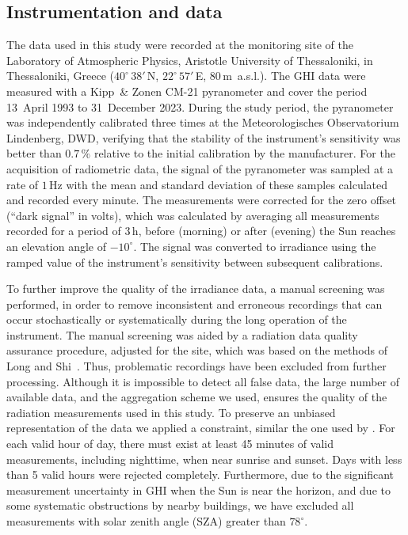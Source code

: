 \documentclass[preprint, 5p,
authoryear]{elsarticle} %
\begin{document}
\hypertarget{instrumentation-and-data}{%
\subsection{Instrumentation and data}\label{instrumentation-and-data}}

The data used in this study were recorded at the monitoring site of the
Laboratory of Atmospheric Physics, Aristotle University of Thessaloniki,
in Thessaloniki, Greece (\(40^\circ\,38'\,\)N, \(22^\circ\,57'\,\)E,
\(80\,\)m~a.s.l.). The GHI data were measured with a Kipp~\& Zonen CM-21
pyranometer and cover the period 13~April 1993 to 31~December 2023.
During the study period, the pyranometer was independently calibrated
three times at the Meteorologisches Observatorium Lindenberg, DWD,
verifying that the stability of the instrument's sensitivity was better
than \(0.7\,\%\) relative to the initial calibration by the
manufacturer. For the acquisition of radiometric data, the signal of the
pyranometer was sampled at a rate of \(1\,\text{Hz}\) with the mean and
standard deviation of these samples calculated and recorded every
minute. The measurements were corrected for the zero offset (``dark
signal'' in volts), which was calculated by averaging all measurements
recorded for a period of \(3\,\text{h}\), before (morning) or after
(evening) the Sun reaches an elevation angle of \(-10^\circ\). The
signal was converted to irradiance using the ramped value of the
instrument's sensitivity between subsequent calibrations.

To further improve the quality of the irradiance data, a manual
screening was performed, in order to remove inconsistent and erroneous
recordings that can occur stochastically or systematically during the
long operation of the instrument. The manual screening was aided by a
radiation data quality assurance procedure, adjusted for the site, which
was based on the methods of Long and Shi~\citep{Long2006, Long2008a}.
Thus, problematic recordings have been excluded from further processing.
Although it is impossible to detect all false data, the large number of
available data, and the aggregation scheme we used, ensures the quality
of the radiation measurements used in this study. To preserve an
unbiased representation of the data we applied a constraint, similar the
one used by \citet{CastillejoCuberos2020}. For each valid hour of day,
there must exist at least 45 minutes of valid measurements, including
nighttime, when near sunrise and sunset. Days with less than 5 valid
hours were rejected completely. Furthermore, due to the significant
measurement uncertainty in GHI when the Sun is near the horizon, and due
to some systematic obstructions by nearby buildings, we have excluded
all measurements with solar zenith angle (SZA) greater than
\(78^\circ\).
\end{document}
